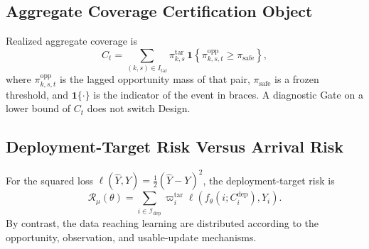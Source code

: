 \documentclass[letterpaper,journal]{IEEEtran}
\begin{document}
\subsection{Aggregate Coverage Certification Object}
\label{subsec:agg_coverage_object}

Realized aggregate coverage is
\begin{equation}
 C_t
 =
 \sum_{(k,s)\in I_{\mathrm{tar}}}
 \pi^{\mathrm{tar}}_{k,s}
 \,
 \mathbf{1}\!\left\{\pi^{\mathrm{opp}}_{k,s,t}\ge\pi_{\mathrm{safe}}\right\},
 \label{eq:agg_Ct}
\end{equation}
where $\pi^{\mathrm{opp}}_{k,s,t}$ is the lagged opportunity mass of
that pair, $\pi_{\mathrm{safe}}$ is a frozen threshold, and
$\mathbf{1}\{\cdot\}$ is the indicator of the event in braces.
A diagnostic Gate on a lower bound of $C_t$ does not switch Design.

\subsection{Deployment-Target Risk Versus Arrival Risk}
\label{subsec:target_risk}

For the squared loss
$\ell(\widehat Y,Y)=\tfrac{1}{2}(\widehat Y-Y)^2$, the deployment-target risk is
\begin{equation}
 \mathcal{R}_{\mu}(\theta)
 =
 \sum_{i\in\mathcal{I}_{\mathrm{dep}}}
 \varpi_i^{\mathrm{tar}}
 \ell\!\left(
 f_{\theta}(i;C_i^{\mathrm{dep}}),Y_i
 \right).
 \label{eq:target_risk}
\end{equation}
By contrast, the data reaching learning are distributed according to the
opportunity, observation, and usable-update mechanisms.
\end{document}
